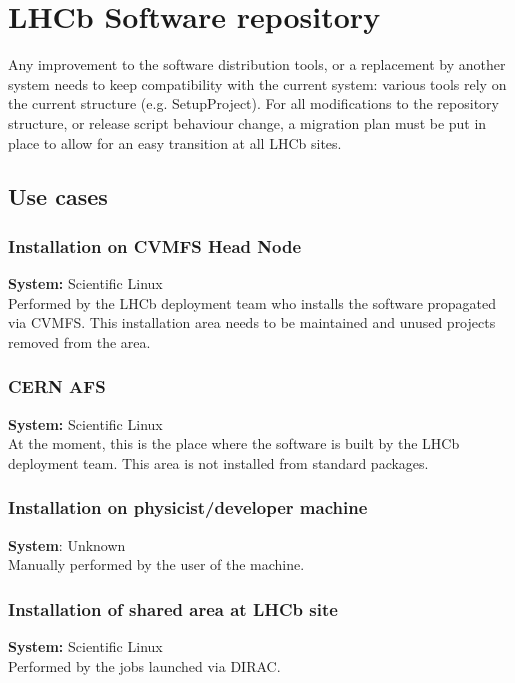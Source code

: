 \documentclass{lhcbnote}
\begin{document}
\pagebreak

\section{LHCb Software repository}

Any improvement to the software distribution tools, or a replacement by another system needs to keep compatibility with the current system: various tools rely on the current structure (e.g. SetupProject). For all modifications to the repository structure, or release script behaviour change, a migration plan must be put in place to allow for an easy transition at all LHCb sites.

\subsection{Use cases}

\subsubsection{Installation on CVMFS Head Node}
\textbf{System:} Scientific Linux\\
Performed by the LHCb deployment team who installs the software propagated via CVMFS. This installation area needs to be maintained and unused projects removed from the area.

\subsubsection{CERN AFS}
\textbf{System:} Scientific Linux\\
At the moment, this is the place where the software is built by the LHCb deployment team. This area is not installed from standard packages.

\subsubsection{Installation on physicist/developer machine}
\textbf{System}: Unknown\\
Manually performed by the user of the machine.

\subsubsection{Installation of shared area at LHCb site}
\textbf{System:} Scientific Linux\\
Performed by the jobs launched via DIRAC.
\end{document}

